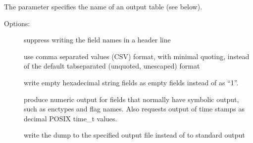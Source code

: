 \documentclass[letterpaper,10pt,english]{sphinxmanual}
\begin{document}
\sphinxAtStartPar
The  parameter specifies the name of an output table (see
below).

\sphinxAtStartPar
Options:
\begin{description}
\item[{}] \leavevmode
\sphinxAtStartPar
suppress writing the field names in a header line

\item[{}] \leavevmode
\sphinxAtStartPar
use comma separated values (CSV) format, with minimal quoting,
instead of the default tab\sphinxhyphen{}separated (unquoted, unescaped) format

\item[{}] \leavevmode
\sphinxAtStartPar
write empty hexadecimal string fields as empty fields instead of
as “\sphinxhyphen{}1”.

\item[{}] \leavevmode
\sphinxAtStartPar
produce numeric output for fields that normally have symbolic
output, such as enctypes and flag names.  Also requests output of
time stamps as decimal POSIX time\_t values.

\item[{ }] \leavevmode
\sphinxAtStartPar
write the dump to the specified output file instead of to standard
output

\end{description}
\end{document}
